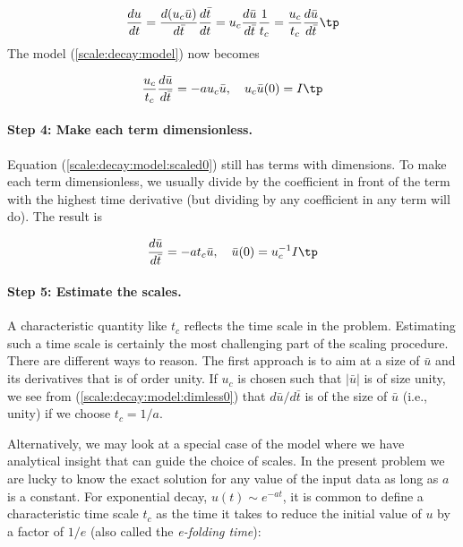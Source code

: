 \documentclass[graybox,envcountchap,sectrefs,final]{svmonodo}
\begin{document}
\[ \frac{du}{dt} = \frac{d (u_c\bar u)}{d\bar t}\frac{d\bar t}{dt}
= u_c\frac{d\bar u}{d\bar t}\frac{1}{t_c} =
\frac{u_c}{t_c}\frac{d\bar u}{d\bar t}\tp
\]
The model (\ref{scale:decay:model}) now becomes

\begin{equation}
\frac{u_c}{t_c}\frac{d\bar u}{d\bar t} = -au_c\bar u,\quad u_c\bar u(0)=I\tp
\label{scale:decay:model:scaled0}
\end{equation}

\paragraph{Step 4: Make each term dimensionless.}
Equation (\ref{scale:decay:model:scaled0}) still has terms with
dimensions. To make each term dimensionless, we usually divide by
the coefficient in front of the term with the highest time derivative
(but dividing by any coefficient in any term will do). The result is

\begin{equation}
\frac{d\bar u}{d\bar t} = -at_c\bar u,\quad \bar u(0)=u_c^{-1}I
\tp
\label{scale:decay:model:dimless0}
\end{equation}

\paragraph{Step 5: Estimate the scales.}
A characteristic quantity like $t_c$ reflects the time scale in the
problem. Estimating such a time scale is certainly
the most challenging part of the scaling procedure. There are different
ways to reason. The first approach
is to aim at a size of $\bar u$ and its derivatives
that is of order unity. If $u_c$ is chosen such that $|\bar u|$ is
of size unity, we see from (\ref{scale:decay:model:dimless0}) that
$d\bar u/d\bar t$ is of the size of $\bar u$ (i.e., unity)
if we choose $t_c = 1/a$.


Alternatively, we may look at a special case of the model where we have
analytical insight that can guide the choice of scales.
In the present problem we are lucky to know the
exact solution for any value of the input data as long as $a$
is a constant. For exponential
decay,
$u(t)\sim e^{-at}$, it is common to define a characteristic time
scale $t_c$ as the time it takes to reduce the initial value of
$u$ by a factor of $1/e$ (also called the \emph{e-folding time}):
\end{document}
